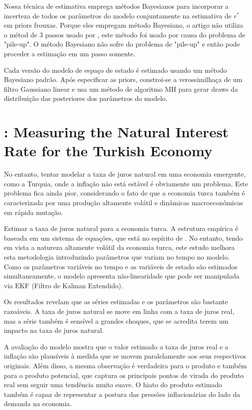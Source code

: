 \documentclass[11pt,oneside,a4paper]{article}
\begin{document}
Nossa técnica de estimativa emprega métodos Bayesianos para incorporar a incerteza de todos os parâmetros do modelo conjuntamente na estimativa de $r^*$ em priors frouxas. Porque eles empregam método Bayesiano, o artigo não utiliza o métod de 3 passos usado por \citet{LW:2003}, este método foi usado por causa do problema de "pile-up". O método Bayesiano não sofre do problema de "pile-up" e então pode proceder a estimação em um passo somente. 

Cada versão do modelo de espaço de estado é estimado usando um método Bayesiano padrão. Após especificar as priors, constroi-se a verossimilhaça de um filtro Gaussiano linear e usa um método de algoritmo MH para gerar draws da distribuição das posteriores dos parâmetros do modelo.
%
%
\section{\citet{Us:2018}: Measuring the Natural Interest Rate for the Turkish Economy }

No entanto, tentar modelar a taxa de juros natural em uma economia emergente, como a Turquia, onde a inflação não está estável é obviamente um problema. Este problema fica ainda pior, considerando o fato de que a economia turca também é caracterizada por uma produção altamente volátil e dinâmicas macroeconômicas em rápida mutação.

Estimar a taxa de juros natural para a economia turca. A estrutura empírica é baseada em um sistema de equações, que está no espírito de \citet{LW:2003}. No entanto, tendo em vista a natureza altamente volátil da economia turca, este estudo melhora esta metodologia introduzindo parâmetros que variam no tempo no modelo. Como os parâmetros variáveis no tempo e as variáveis de estado são estimados simultaneamente, o modelo apresenta não-linearidade que pode ser manipulada via EKF (Filtro de Kalman Extendido).

Os resultados revelam que as séries estimadas e os parâmetros
são bastante razoáveis. A taxa de juros natural se move em linha com a taxa de juros real, mas a série também é sensível a grandes choques, que se acredita terem um impacto na taxa de juros natural.

A avaliação do modelo mostra que o valor estimado a taxa de juros real e a inflação são plausíveis à medida que se movem paralelamente aos seus respectivos originais. Além disso, a mesma observação é verdadeira para o produto e também para o produto potencial, que captura os principais pontos de virada do produto real sem seguir uma tendência muito suave. O hiato do produto estimado também é capaz de representar a postura das pressões inflacionárias do lado da demanda na economia.
\end{document}
